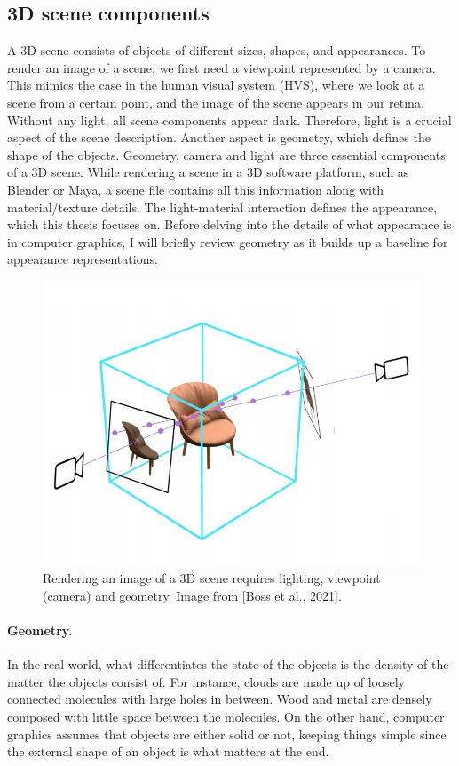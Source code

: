 \subsection{3D scene components}

A 3D scene consists of objects of different sizes, shapes, and appearances. To render an image of a scene, we first need a viewpoint represented by a camera. This mimics the case in the human visual system (HVS), where we look at a scene from a certain point, and the image of the scene appears in our retina. Without any light, all scene components appear dark. Therefore, light is a crucial aspect of the scene description. Another aspect is geometry, which defines the shape of the objects. Geometry, camera and light are three essential components of a 3D scene. While rendering a scene in a 3D software platform, such as Blender or Maya, a scene file contains all this information along with material/texture details. The light-material interaction defines the appearance, which this thesis focuses on. Before delving into the details of what appearance is in computer graphics, I will briefly review geometry as it builds up a baseline for appearance representations.

\begin{figure}
  \centering
   \includegraphics[width=0.7\linewidth]{Images/scene_with_camera.jpg}
   \caption{Rendering an image of a 3D scene requires lighting, viewpoint (camera) and geometry. Image from [Boss et al., 2021].}
   \label{fig:teaser}
\end{figure}


\paragraph{Geometry.} In the real world, what differentiates the state of the objects is the density of the matter the objects consist of. For instance, clouds are made up of loosely connected molecules with large holes in between. Wood and metal are densely composed with little space between the molecules. On the other hand, computer graphics assumes that objects are either solid or not, keeping things simple since the external shape of an object is what matters at the end. 


